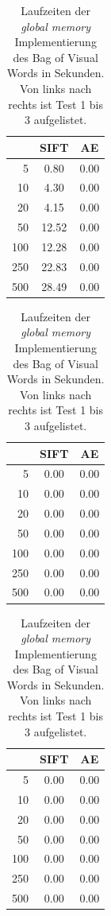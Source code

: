 \begin{table}
    \hfill
    \begin{tabular}[t]{| r | c | c |}
    \hline
	     & SIFT  & AE \\ \hline    
    5    &  0.80 & 0.00 \\ \hline
    10   &  4.30 & 0.00 \\ \hline
    20   &  4.15 & 0.00 \\ \hline
    50   & 12.52 & 0.00 \\ \hline
    100  & 12.28 & 0.00 \\ \hline
	250  & 22.83 & 0.00 \\ \hline
	500  & 28.49 & 0.00 \\ \hline
	\end{tabular}
    \hfill
    \begin{tabular}[t]{| r | c | c |}
    \hline
	     & SIFT & AE \\ \hline    
    5    & 0.00 & 0.00 \\ \hline
    10   & 0.00 & 0.00 \\ \hline
    20   & 0.00 & 0.00 \\ \hline
    50   & 0.00 & 0.00 \\ \hline
    100  & 0.00 & 0.00 \\ \hline
	250  & 0.00 & 0.00 \\ \hline
	500  & 0.00 & 0.00 \\ \hline    
    \end{tabular}
    \hfill
    \begin{tabular}[t]{| r | c | c |}
    \hline
	     & SIFT & AE \\ \hline    
    5    & 0.00 & 0.00 \\ \hline
    10   & 0.00 & 0.00 \\ \hline
    20   & 0.00 & 0.00 \\ \hline
    50   & 0.00 & 0.00 \\ \hline
    100  & 0.00 & 0.00 \\ \hline
	250  & 0.00 & 0.00 \\ \hline
	500  & 0.00 & 0.00 \\ \hline    
    \end{tabular}
    \hfill
	\caption{Laufzeiten der \textit{global memory} Implementierung des Bag of Visual Words in Sekunden. Von links nach rechts ist Test 1 bis 3 aufgelistet.}
\end{table}

